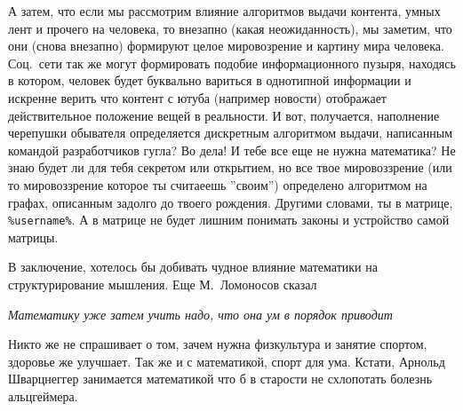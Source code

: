 А затем, что если мы рассмотрим влияние алгоритмов выдачи контента, умных лент и прочего на человека, то внезапно (какая неожиданность),
мы заметим, что они (снова внезапно) формируют целое мировозрение и картину мира человека.
Соц.\ сети так же могут формировать подобие информационного пузыря, находясь в котором, человек будет буквально вариться в однотипной
информации и искренне верить что контент с ютуба (например новости) отображает действительное положение вещей в реальности.
И вот, получается, наполнение черепушки обывателя определяется дискретным алгоритмом выдачи, написанным командой разработчиков гугла?
Во дела!
И тебе все еще не нужна математика?
Не знаю будет ли для тебя секретом или открытием, но все твое мировоззрение (или то мировоззрение которое ты считаеешь ''своим'')
определено алгоритмом на графах, описанным задолго до твоего рождения.
Другими словами, ты в матрице, \texttt{\%username\%}.
А в матрице не будет лишним понимать законы и устройство самой матрицы.

В заключение, хотелось бы добивать чудное влияние математики на структурирование мышления.
Еще М.\ Ломоносов сказал

\begin{displayquote}
    \textit{
        Математику уже затем учить надо, что она ум в порядок приводит
    }
\end{displayquote}

Никто же не спрашивает о том, зачем нужна физкультура и занятие спортом, здоровье же улучшает.
Так же и с математикой, спорт для ума.
Кстати, Арнольд Шварцнеггер занимается математикой что б в старости не схлопотать болезнь альцгеймера.